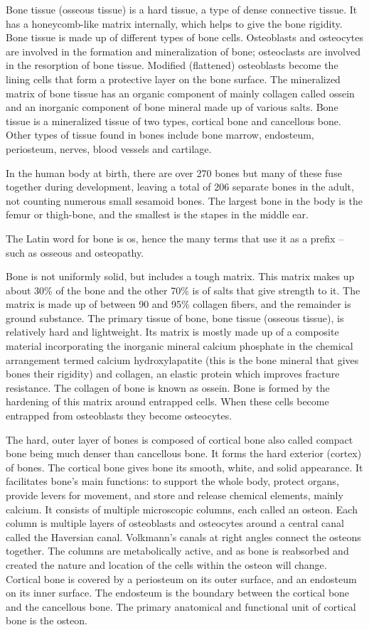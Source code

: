 \documentclass[]{book}
\theoremstyle{definition}
\theoremstyle{definition}
\theoremstyle{definition}
\theoremstyle{remark}
\begin{document}
Bone tissue (osseous tissue) is a hard tissue, a type of dense
connective tissue. It has a honeycomb-like matrix internally, which
helps to give the bone rigidity. Bone tissue is made up of different
types of bone cells. Osteoblasts and osteocytes are involved in the
formation and mineralization of bone; osteoclasts are involved in the
resorption of bone tissue. Modified (flattened) osteoblasts become the
lining cells that form a protective layer on the bone surface. The
mineralized matrix of bone tissue has an organic component of mainly
collagen called ossein and an inorganic component of bone mineral made
up of various salts. Bone tissue is a mineralized tissue of two types,
cortical bone and cancellous bone. Other types of tissue found in bones
include bone marrow, endosteum, periosteum, nerves, blood vessels and
cartilage.

In the human body at birth, there are over 270 bones but many of these
fuse together during development, leaving a total of 206 separate bones
in the adult, not counting numerous small sesamoid bones. The largest
bone in the body is the femur or thigh-bone, and the smallest is the
stapes in the middle ear.

The Latin word for bone is os, hence the many terms that use it as a
prefix -- such as osseous and osteopathy.

Bone is not uniformly solid, but includes a tough matrix. This matrix
makes up about 30\% of the bone and the other 70\% is of salts that give
strength to it. The matrix is made up of between 90 and 95\% collagen
fibers, and the remainder is ground substance. The primary tissue of
bone, bone tissue (osseous tissue), is relatively hard and lightweight.
Its matrix is mostly made up of a composite material incorporating the
inorganic mineral calcium phosphate in the chemical arrangement termed
calcium hydroxylapatite (this is the bone mineral that gives bones their
rigidity) and collagen, an elastic protein which improves fracture
resistance. The collagen of bone is known as ossein. Bone is formed by
the hardening of this matrix around entrapped cells. When these cells
become entrapped from osteoblasts they become osteocytes.

The hard, outer layer of bones is composed of cortical bone also called
compact bone being much denser than cancellous bone. It forms the hard
exterior (cortex) of bones. The cortical bone gives bone its smooth,
white, and solid appearance. It facilitates bone's main functions: to
support the whole body, protect organs, provide levers for movement, and
store and release chemical elements, mainly calcium. It consists of
multiple microscopic columns, each called an osteon. Each column is
multiple layers of osteoblasts and osteocytes around a central canal
called the Haversian canal. Volkmann's canals at right angles connect
the osteons together. The columns are metabolically active, and as bone
is reabsorbed and created the nature and location of the cells within
the osteon will change. Cortical bone is covered by a periosteum on its
outer surface, and an endosteum on its inner surface. The endosteum is
the boundary between the cortical bone and the cancellous bone. The
primary anatomical and functional unit of cortical bone is the osteon.
\end{document}
